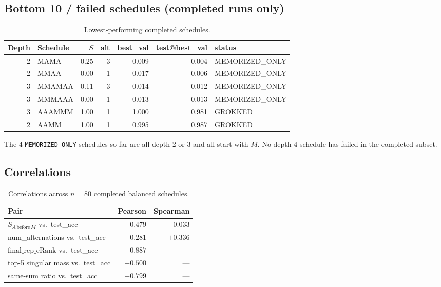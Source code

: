 \documentclass[10pt]{article}
\begin{document}
\subsection{Bottom 10 / failed schedules (completed runs only)}

\begin{table}[h]
\centering
\caption{Lowest-performing completed schedules.}
\label{tab:bottom10}
\small
\begin{tabular}{rlrrrrl}
\toprule
Depth & Schedule & $S$ & alt & best\_val & test@best\_val & status\\
\midrule
2 & MAMA     & 0.25 & 3 & 0.009 & 0.004 & MEMORIZED\_ONLY \\
2 & MMAA     & 0.00 & 1 & 0.017 & 0.006 & MEMORIZED\_ONLY \\
3 & MMAMAA   & 0.11 & 3 & 0.014 & 0.012 & MEMORIZED\_ONLY \\
3 & MMMAAA   & 0.00 & 1 & 0.013 & 0.013 & MEMORIZED\_ONLY \\
3 & AAAMMM   & 1.00 & 1 & 1.000 & 0.981 & GROKKED \\
2 & AAMM     & 1.00 & 1 & 0.995 & 0.987 & GROKKED \\
\bottomrule
\end{tabular}
\end{table}

The 4 \texttt{MEMORIZED\_ONLY} schedules so far are all depth 2 or 3 and all start with $M$. No depth-4 schedule has failed in the completed subset.

\subsection{Correlations}

\begin{table}[h]
\centering
\caption{Correlations across $n = 80$ completed balanced schedules.}
\label{tab:correlations}
\begin{tabular}{lrr}
\toprule
Pair & Pearson & Spearman \\
\midrule
$S_{A\,\text{before}\,M}$ vs.\ test\_acc          & $+0.479$ & $-0.033$ \\
num\_alternations vs.\ test\_acc                  & $+0.281$ & $+0.336$ \\
$\mathrm{final\_rep\_eRank}$ vs.\ test\_acc       & $\mathbf{-0.887}$ & --- \\
top-5 singular mass vs.\ test\_acc                & $+0.500$ & --- \\
same-sum ratio vs.\ test\_acc                     & $\mathbf{-0.799}$ & --- \\
\bottomrule
\end{tabular}
\end{table}
\end{document}
